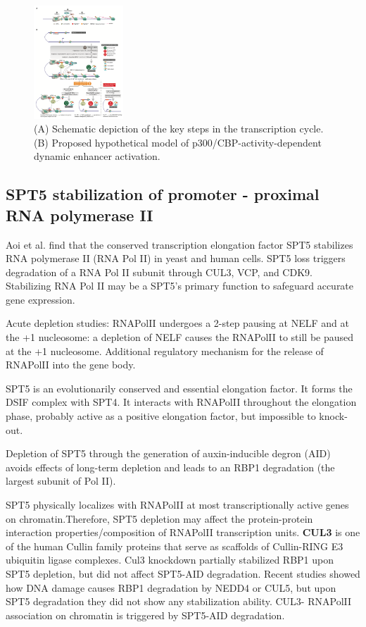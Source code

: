 \begin{figure}
\centering
\includegraphics[width=0.3\textwidth]{../_resources/Screenshot_2022-12-19_at_16-39-14.png}
\caption{(A) Schematic depiction of the key steps in the transcription cycle.
(B) Proposed hypothetical model of p300/CBP-activity-dependent dynamic enhancer activation. }
\end{figure}

\subsection{SPT5 stabilization of promoter - proximal RNA polymerase II}
Aoi et al. find that the conserved transcription elongation factor SPT5 stabilizes RNA polymerase II (RNA Pol II) in yeast and human
cells. SPT5 loss triggers degradation of a RNA Pol II subunit through CUL3, VCP, and CDK9. Stabilizing RNA Pol II may be a SPT5’s primary function to safeguard accurate gene expression.

Acute depletion studies: RNAPolII undergoes a 2-step pausing at NELF and at the +1 nucleosome: a depletion of NELF causes the RNAPolII to still be paused at the +1 nucleosome. Additional regulatory mechanism for the release of RNAPolII into the gene body.

SPT5 is an evolutionarily conserved and essential elongation factor. It forms the DSIF complex with SPT4. It interacts with RNAPolII throughout the elongation phase, probably active as a positive elongation factor, but impossible to knock-out.

Depletion of SPT5 through the generation of auxin-inducible degron (AID) avoids effects of long-term depletion and leads to an RBP1 degradation (the largest subunit of Pol II). 

SPT5 physically localizes with RNAPolII at most transcriptionally active genes on chromatin.Therefore, SPT5 depletion may affect the protein-protein interaction properties/composition of RNAPolII transcription units. \textbf{CUL3} is one of the human Cullin family proteins that serve as scaffolds of Cullin-RING E3 ubiquitin ligase complexes. Cul3 knockdown partially stabilized RBP1 upon SPT5 depletion, but did not affect SPT5-AID degradation. Recent studies showed how DNA damage causes RBP1 degradation by NEDD4 or CUL5, but upon SPT5 degradation they did not show any stabilization ability. CUL3- RNAPolII association on chromatin is triggered by SPT5-AID degradation.

